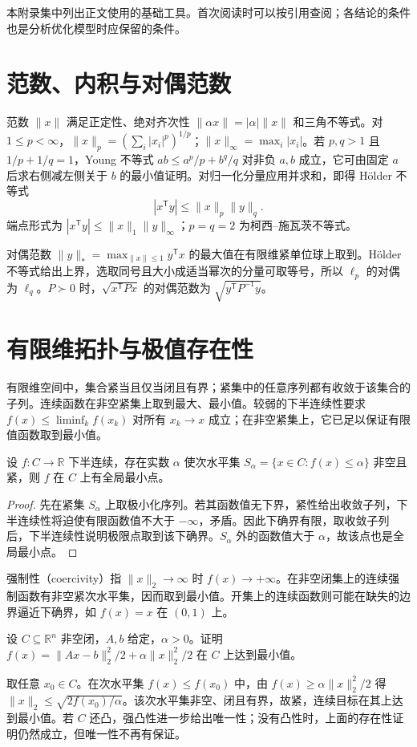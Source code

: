\documentclass[UTF8,12pt,a4paper,fontset=fandol]{ctexbook}
\begin{document}
本附录集中列出正文使用的基础工具。首次阅读时可以按引用查阅；各结论的条件也是分析优化模型时应保留的条件。

\section{范数、内积与对偶范数}

范数 $\|x\|$ 满足正定性、绝对齐次性 $\|\alpha x\|=|\alpha|\|x\|$ 和三角不等式。对 $1\leq p<\infty$，$\|x\|_p=(\sum_i|x_i|^p)^{1/p}$；$\|x\|_\infty=\max_i|x_i|$。若 $p,q>1$ 且 $1/p+1/q=1$，Young 不等式 $ab\leq a^p/p+b^q/q$ 对非负 $a,b$ 成立，它可由固定 $a$ 后求右侧减左侧关于 $b$ 的最小值证明。对归一化分量应用并求和，即得 Hölder 不等式
\[
 |x^{\mathsf T}y|\leq\|x\|_p\|y\|_q.
\]
端点形式为 $|x^{\mathsf T}y|\leq\|x\|_1\|y\|_\infty$；$p=q=2$ 为柯西--施瓦茨不等式。

对偶范数 $\|y\|_*=\max_{\|x\|\leq1}y^{\mathsf T}x$ 的最大值在有限维紧单位球上取到。Hölder 不等式给出上界，选取同号且大小成适当幂次的分量可取等号，所以 $\ell_p$ 的对偶为 $\ell_q$。$P\succ0$ 时，$\sqrt{x^{\mathsf T}Px}$ 的对偶范数为 $\sqrt{y^{\mathsf T}P^{-1}y}$。

\section{有限维拓扑与极值存在性}

有限维空间中，集合紧当且仅当闭且有界；紧集中的任意序列都有收敛于该集合的子列。连续函数在非空紧集上取到最大、最小值。较弱的下半连续性要求 $f(x)\leq\liminf_k f(x_k)$ 对所有 $x_k\to x$ 成立；在非空紧集上，它已足以保证有限值函数取到最小值。

\begin{proposition}
设 $f:C\to\mathbb R$ 下半连续，存在实数 $\alpha$ 使次水平集 $S_\alpha=\{x\in C:f(x)\leq\alpha\}$ 非空且紧，则 $f$ 在 $C$ 上有全局最小点。
\end{proposition}
\begin{proof}
先在紧集 $S_\alpha$ 上取极小化序列。若其函数值无下界，紧性给出收敛子列，下半连续性将迫使有限函数值不大于 $-\infty$，矛盾。因此下确界有限，取收敛子列后，下半连续性说明极限点取到该下确界。$S_\alpha$ 外的函数值大于 $\alpha$，故该点也是全局最小点。
\end{proof}

强制性（coercivity）指 $\|x\|_2\to\infty$ 时 $f(x)\to+\infty$。在非空闭集上的连续强制函数有非空紧次水平集，因而取到最小值。开集上的连续函数则可能在缺失的边界逼近下确界，如 $f(x)=x$ 在 $(0,1)$ 上。

\begin{example}[用次水平集证明最优解存在]
设 $C\subseteq\mathbb R^n$ 非空闭，$A,b$ 给定，$\alpha>0$。证明 $f(x)=\|Ax-b\|_2^2/2+\alpha\|x\|_2^2/2$ 在 $C$ 上达到最小值。
\end{example}
\begin{solve}
取任意 $x_0\in C$。在次水平集 $f(x)\leq f(x_0)$ 中，由 $f(x)\geq\alpha\|x\|_2^2/2$ 得 $\|x\|_2\leq\sqrt{2f(x_0)/\alpha}$。该次水平集非空、闭且有界，故紧，连续目标在其上达到最小值。若 $C$ 还凸，强凸性进一步给出唯一性；没有凸性时，上面的存在性证明仍然成立，但唯一性不再有保证。
\end{solve}
\end{document}
